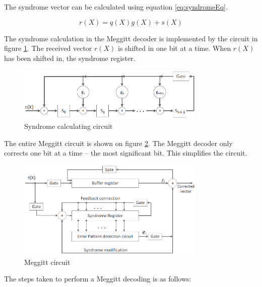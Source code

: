 \documentclass[Main]{subfiles}
\begin{document}
The syndrome vector can be calculated using equation \ref{eq:syndromeEq}.

\begin{equation} \label{eq:syndromeEq}
r(X) = q(X)g(X)+s(X)
\end{equation}

The syndrome calculation in the Meggitt decoder is implemented by the circuit in figure \ref{fig:syndromeCirc}. The received vector $r(X)$ is shifted in one bit at a time. When $r(X)$ has been shifted in, the syndrome register.

\begin{figure}[H]
    \centering
    \includegraphics[width=0.8\textwidth]{figures/syndromeCircuit}
    \caption{Syndrome calculating circuit}
    \label{fig:syndromeCirc}
\end{figure}

The entire Meggitt circuit is shown on figure \ref{fig:meggitCirc}. The Meggitt decoder only corrects one bit at a time -- the most significant bit. This simplifies the circuit.

\begin{figure}[H]
    \centering
    \includegraphics[width=0.8\textwidth]{figures/meggitCircuit}
    \caption{Meggitt circuit}
    \label{fig:meggitCirc}
\end{figure}

The steps taken to perform a Meggitt decoding is as follows:
\end{document}
